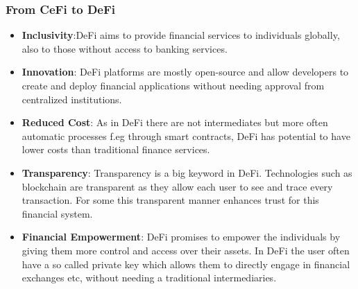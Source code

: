 \documentclass{article}
\begin{document}
\subsubsection{From CeFi to DeFi}
\begin{itemize}
    \item \textbf{Inclusivity}:DeFi aims to provide financial services to individuals globally, also to those without access to banking services.
    \item \textbf{Innovation}: DeFi platforms are mostly open-source and allow developers to create and deploy financial applications without needing approval from centralized institutions.
    \item \textbf{Reduced Cost}: As in DeFi there are not intermediates but more often automatic processes f.eg through smart contracts, DeFi has potential to have lower costs than traditional finance services.
    \item \textbf{Transparency}: Transparency is a big keyword in DeFi. Technologies such as blockchain are transparent as they allow each user to see and trace every transaction. For some this transparent manner enhances trust for this financial system.
    \item \textbf{Financial Empowerment}: DeFi promises to empower the individuals by giving them more control and access over their assets. In DeFi the user often have a so called private key which allows them to directly engage in financial exchanges etc, without needing a traditional intermediaries.

\end{itemize}
\end{document}
